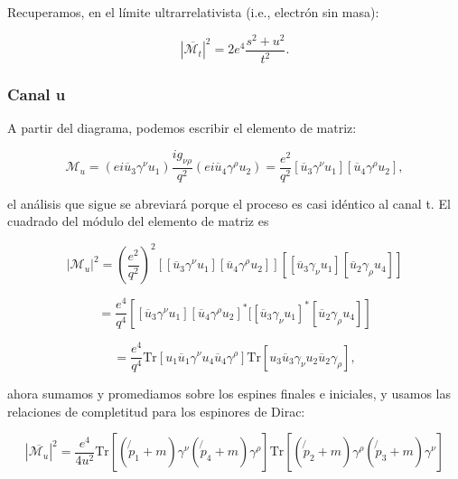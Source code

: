 Recuperamos, en el límite ultrarrelativista (i.e., electrón sin masa):

\begin{equation}
|\overline{\mathcal{M}_t}|^2 = 2e^4 \frac{s^2 + u^2}{t^2}.
\end{equation}

\subsubsection{Canal u}

A partir del diagrama, podemos escribir el elemento de matriz:

\begin{equation}
\mathcal{M}_u = (ei\overline{u}_3\gamma^\nu u_1) \frac{ig_{\nu\rho}}{q^2} (ei\overline{u}_4\gamma^\rho u_2) = \frac{e^2}{q^2} [\overline{u}_3\gamma^\nu u_1][\overline{u}_4\gamma^\rho u_2],
\end{equation}

el análisis que sigue se abreviará porque el proceso es casi idéntico al canal t. El cuadrado del módulo del elemento de matriz es

\begin{equation}
|\mathcal{M}_u|^2 = \left( \frac{e^2}{q^2} \right)^2 \left[ [\overline{u}_3\gamma^\nu u_1][\overline{u}_4\gamma^\rho u_2] \right]\left[[\overline{u}_3\gamma_\nu u_1][\overline{u}_2\gamma_\rho u_4]\right]
\end{equation}

\begin{equation}
= \frac{e^4}{q^4} \left[ [\overline{u}_3\gamma^\nu u_1][\overline{u}_4\gamma^\rho u_2]^*[ [\overline{u}_3\gamma_\nu u_1]^*[\overline{u}_2\gamma_\rho u_4] \right]
\end{equation}

\begin{equation}
= \frac{e^4}{q^4} \text{Tr}[u_1\overline{u}_1\gamma^\nu u_4\overline{u}_4\gamma^\rho] \text{Tr}[u_3\overline{u}_3\gamma_\nu u_2\overline{u}_2\gamma_\rho],
\end{equation}

ahora sumamos y promediamos sobre los espines finales e iniciales, y usamos las relaciones de completitud para los espinores de Dirac:

\begin{equation}
|\overline{\mathcal{M}_u}|^2 = \frac{e^4}{4u^2} \text{Tr}[(\not{p}_1 + m)\gamma^\nu (\not{p}_4 + m)\gamma^\rho] \text{Tr}[(\not{p}_2 + m)\gamma^\rho (\not{p}_3 + m)\gamma^\nu]
\end{equation}

